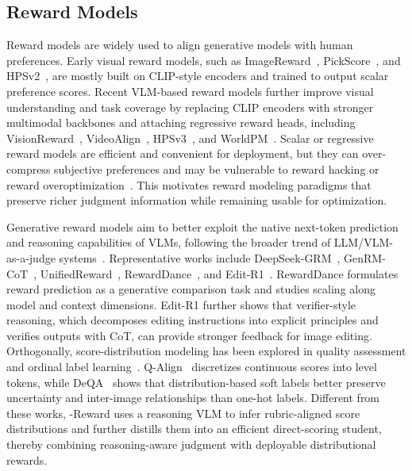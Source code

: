 \documentclass{llmxive}
\providecommand{\mname}{\twemoji[width=0.75em]{zap}-Reward\xspace}
\begin{document}
\subsection{Reward Models}

Reward models are widely used to align generative models with human preferences. Early visual reward models, such as ImageReward~\cite{xu2023imagereward}, PickScore~\cite{kirstain2023pickapicopendatasetuser}, and HPSv2~\cite{wu2023humanpreferencescorev2}, are mostly built on CLIP-style encoders and trained to output scalar preference scores. Recent VLM-based reward models further improve visual understanding and task coverage by replacing CLIP encoders with stronger multimodal backbones and attaching regressive reward heads, including VisionReward~\cite{xu2026visionrewardfinegrainedmultidimensionalhuman}, VideoAlign~\cite{liu2025improvingvideogenerationhuman}, HPSv3~\cite{ma2025hpsv3widespectrumhumanpreference}, and WorldPM~\cite{wang2025worldpmscalinghumanpreference}. Scalar or regressive reward models are efficient and convenient for deployment, but they can over-compress subjective preferences and may be vulnerable to reward hacking or reward overoptimization~\cite{you2025teachinglargelanguagemodels,wu2025rewarddancerewardscalingvisual,gao2023scaling,rafailov2024scaling}. This motivates reward modeling paradigms that preserve richer judgment information while remaining usable for optimization. %

Generative reward models aim to better exploit the native next-token prediction and reasoning capabilities of VLMs, following the broader trend of LLM/VLM-as-a-judge systems~\cite{zheng2023judging,gu2024surveyllmasajudge,chen2024mllmjudge,chen2024mjbench}. Representative works include DeepSeek-GRM~\cite{liu2025inferencetimescalinggeneralistreward}, GenRM-CoT~\cite{zhang2025generativeverifiersrewardmodeling}, UnifiedReward~\cite{wang2026unifiedrewardmodelmultimodal}, RewardDance~\cite{wu2025rewarddancerewardscalingvisual}, and Edit-R1~\cite{guo2026leveraging}. RewardDance formulates reward prediction as a generative comparison task and studies scaling along model and context dimensions. Edit-R1 further shows that verifier-style reasoning, which decomposes editing instructions into explicit principles and verifies outputs with CoT, can provide stronger feedback for image editing. Orthogonally, score-distribution modeling has been explored in quality assessment and ordinal label learning~\cite{murray2012ava,talebi2018nima,diaz2019soft,wen2023ordinal}. Q-Align~\cite{wu2023qalign} discretizes continuous scores into level tokens, while DeQA~\cite{you2025teachinglargelanguagemodels} shows that distribution-based soft labels better preserve uncertainty and inter-image relationships than one-hot labels. Different from these works, \mname uses a reasoning VLM to infer rubric-aligned score distributions and further distills them into an efficient direct-scoring student, thereby combining reasoning-aware judgment with deployable distributional rewards.
\end{document}
